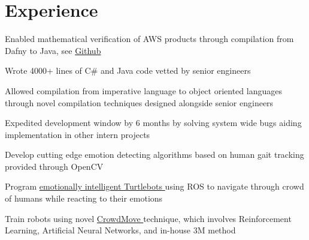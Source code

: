 \documentclass[]{jack-resume}
\begin{document}


\section{Experience}

\begin{tightemize}
    \item Enabled mathematical verification of AWS products through compilation from Dafny to Java, see \href{https://github.com/dafny-lang/dafny}{Github \ExternalLink}
    \item Wrote 4000+ lines of C\# and Java code vetted by senior engineers
    \item Allowed compilation from imperative language to object oriented languages through novel compilation techniques designed alongside senior engineers
    \item Expedited development window by 6 months by solving system wide bugs aiding implementation in other intern projects
\end{tightemize}
\sectionsep

\begin{tightemize}
    \item Develop cutting edge emotion detecting algorithms based on human gait tracking provided through OpenCV
    \item Program \href{https://arxiv.org/abs/1903.03217}{{emotionally intelligent Turtlebots \ExternalLink}} using ROS to navigate through crowd of humans while reacting to their emotions
    \item Train robots using novel \href{https://arxiv.org/abs/1807.07870}{{CrowdMove \ExternalLink}} technique, which involves Reinforcement Learning, Artificial Neural Networks, and in-house 3M method
\end{tightemize}
\sectionsep
\end{document}
